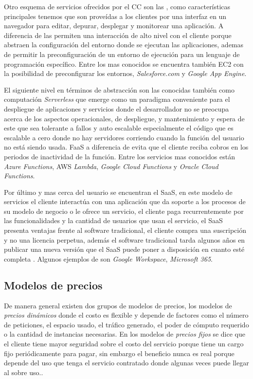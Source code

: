 Otro esquema de servicios ofrecidos por el \acrshort{CC} son las  , como características principales tenemos que son proveídas a los clientes por una interfaz en un navegador para editar, depurar, desplegar y monitorear una aplicación.\cite[p.1]{lawton2008developing} A diferencia de las  permiten una interacción de alto nivel con el cliente porque abstraen la configuración del entorno donde se ejecutan las aplicaciones, ademas de permitir la preconfiguración de un entorno de ejecución para un lenguaje de programación específico. Entre los  mas conocidos se encuentra también \acrshort{EC2} con la posibilidad de preconfigurar los entornos,  \emph{Salesforce.com} y \emph{Google App Engine}. \bigskip

El siguiente nivel en términos de abstracción son las  conocidas también como computación \emph{Serverless} \cite[p.1]{lynn2017preliminary} que emerge como un paradigma conveniente para el despliegue de aplicaciones y servicios donde el desarrollador no se preocupa acerca de los aspectos operacionales, de despliegue, y mantenimiento y espera de este que sea tolerante a fallos y auto escalable especialmente el código que es escalable a cero donde no hay servidores corriendo cuando la función del usuario no está siendo usada. \acrshort{FaaS} a diferencia de  evita que el cliente reciba cobros en los periodos de inactividad de la función.\cite[p.5]{Baldini2017} Entre los servicios mas conocidos están \emph{Azure Functions}, \acrshort{AWS} \emph{Lambda}, \emph{Google Cloud Functions} y \emph{Oracle Cloud Functions}.\bigskip

Por último y mas cerca del usuario se encuentran el \acrfull{SaaS}, en este modelo de servicios el cliente interactúa con una aplicación que da soporte a los procesos de su modelo de negocio o le ofrece un servicio, el cliente paga recurrentemente por las funcionalidades y la cantidad de usuarios que usan el servicio, el \acrshort{SaaS} presenta ventajas frente al software tradicional, el cliente compra una suscripción y no una licencia perpetua, además el software tradicional tarda algunos años en publicar una nueva versión que el \acrshort{SaaS} puede poner a disposición en cuanto esté completa \cite[p.1]{choudhary2007software}. Algunos ejemplos de  son \emph{Google Workspace}, \emph{Microsoft 365}. \bigskip

\subsection{Modelos de precios}
De manera general existen dos grupos de modelos de precios, los modelos de \emph{precios dinámicos} donde el costo es flexible y depende de factores como el número de peticiones, el espacio usado, el tráfico generado, el poder de cómputo requerido o la cantidad de instancias necesarias. En los modelos de \emph{precios fijos} se dice que el cliente tiene mayor seguridad sobre el costo del servicio porque tiene un cargo fijo periódicamente para pagar, sin embargo el beneficio nunca es real porque depende del uso que tenga el servicio contratado donde algunas veces puede llegar al sobre uso.\cite[p.4]{soni2017pricing}.\bigskip


